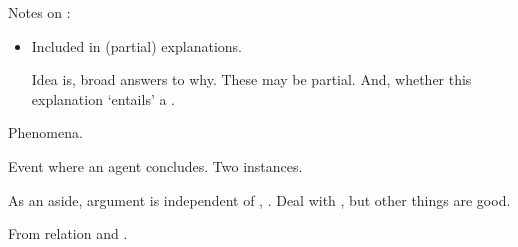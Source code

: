 \documentclass[10pt]{article}
\begin{document}
\begin{note}
  Notes on \qWhy{}:
  \begin{itemize}
  \item
    Included in (partial) explanations.

    Idea is, broad answers to why.
    These may be partial.
    And, whether this explanation `entails' a .
  \end{itemize}
\end{note}


\begin{note}
  Phenomena.

  Event where an agent concludes.
  Two instances.

  As an aside, argument is independent of \prop{}, \val{}.
  Deal with , but other things are good.

  From relation and \fofr{}.
\end{note}
\end{document}

